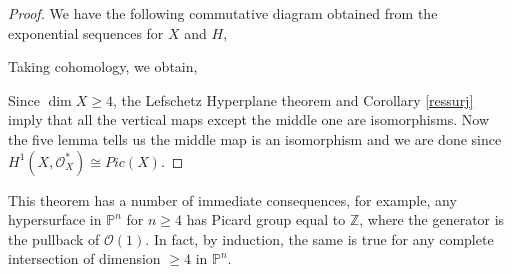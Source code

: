 \documentclass[a4paper]{article}
\newcommand{\OO}{\mathcal{O}}
\newcommand{\PP}{\mathbb{P}}
\newcommand{\Z}{\mathbb{Z}}
\numberwithin{theorem}{section}
\numberwithin{equation}{section}
\begin{document}
\begin{proof}
We have the following commutative diagram obtained from the exponential sequences for $X$ and $H$,

\begin{center}
\end{center}

Taking cohomology, we obtain,
\begin{center}
\end{center}

Since $\dim X \geq 4$, the Lefschetz Hyperplane theorem and Corollary \ref{ressurj} imply that all the vertical maps except the middle one are isomorphisms. Now the five lemma tells us the middle map is an isomorphism and we are done since $H^1(X,\OO_X^*) \cong Pic(X)$.
\end{proof}

This theorem has a number of immediate consequences, for example, any hypersurface in $\PP^n$ for $n \geq 4$ has Picard group equal to $\Z$, where the generator is the pullback of $\OO(1)$. In fact, by induction, the same is true for any complete intersection of dimension $\geq 4$ in $\PP^n$.




\end{document}
